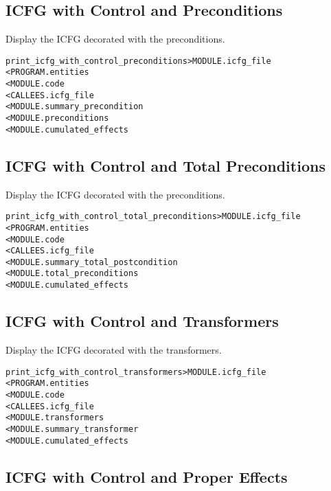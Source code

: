 \documentclass[a4paper]{report}
\newenvironment{PipsMake}{\begin{alltt}}{\end{alltt}}
\begin{document}
\subsection{ICFG with Control and Preconditions}

Display the ICFG decorated with the preconditions.
\begin{PipsMake}
print_icfg_with_control_preconditions   > MODULE.icfg_file
        < PROGRAM.entities
        < MODULE.code
        < CALLEES.icfg_file
        < MODULE.summary_precondition
        < MODULE.preconditions
        < MODULE.cumulated_effects
\end{PipsMake}

\subsection{ICFG with Control and Total Preconditions}

Display the ICFG decorated with the preconditions.
\begin{PipsMake}
print_icfg_with_control_total_preconditions   > MODULE.icfg_file
        < PROGRAM.entities
        < MODULE.code
        < CALLEES.icfg_file
        < MODULE.summary_total_postcondition
        < MODULE.total_preconditions
        < MODULE.cumulated_effects
\end{PipsMake}

\subsection{ICFG with Control and Transformers}

Display the ICFG decorated with the transformers.
\begin{PipsMake}
print_icfg_with_control_transformers    > MODULE.icfg_file
        < PROGRAM.entities
        < MODULE.code
        < CALLEES.icfg_file
        < MODULE.transformers
        < MODULE.summary_transformer
        < MODULE.cumulated_effects
\end{PipsMake}

\subsection{ICFG with Control and Proper Effects}
\end{document}
